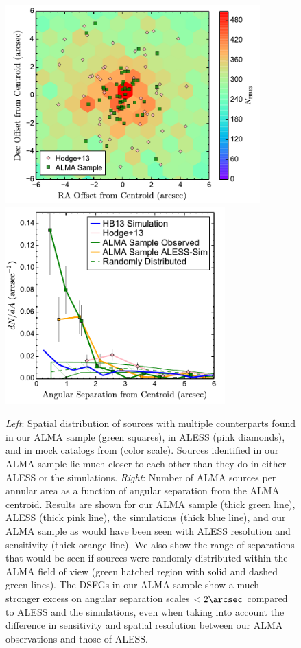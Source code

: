 \documentclass[iop]{emulateapj}
\begin{document}
\begin{figure}[!tbp] 
\includegraphics[height=3in]{../Figures/AllPositions.pdf}
\includegraphics[height=3in]{../Figures/dNdA.pdf}

\caption{ {\it Left}: Spatial distribution of sources with multiple counterparts
found in our ALMA sample (green squares), in ALESS (pink diamonds), and in mock
catalogs from \citet{HB13} (color scale).  Sources identified in our ALMA sample
lie much closer to each other than they do in either ALESS or the \citet{HB13}
simulations.  {\it Right}: Number of ALMA sources per annular area as a function
of angular separation from the ALMA centroid.  Results are shown for our ALMA
sample (thick green line), ALESS (thick pink line), the \citet{HB13} simulations
(thick blue line), and our ALMA sample as would have been seen with ALESS
resolution and sensitivity (thick orange line).  We also show the range of
separations that would be seen if sources were randomly distributed within the
ALMA field of view (green hatched region with solid and dashed green lines).
The DSFGs in our ALMA sample show a much stronger excess on angular separation
scales $<2\arcsec$ compared to ALESS and the \citet{HB13} simulations, even when
taking into account the difference in sensitivity and spatial resolution between
our ALMA observations and those of ALESS.  } \label{fig:dNdA}

\end{figure}
\end{document}
